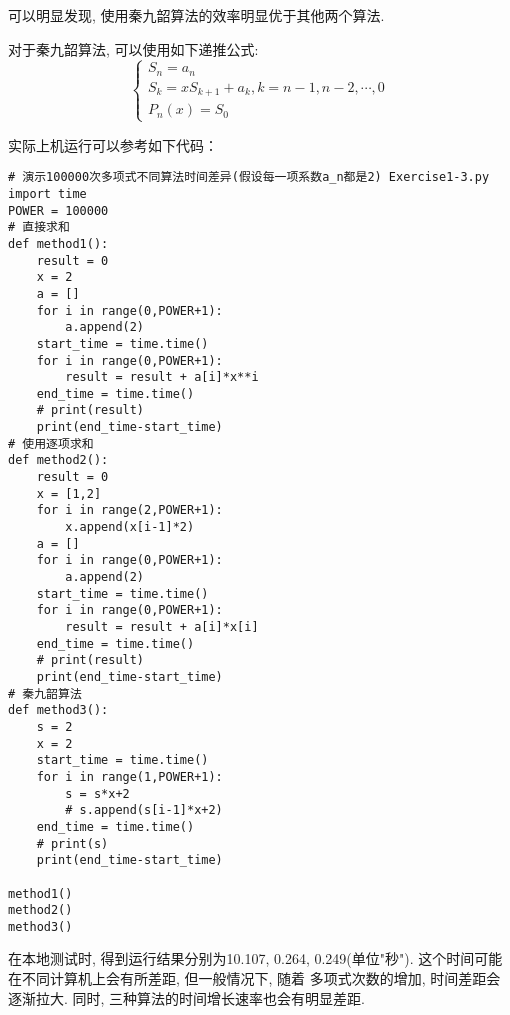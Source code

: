 可以明显发现, 使用秦九韶算法的效率明显优于其他两个算法.

对于秦九韶算法, 可以使用如下递推公式:
\begin{equation*}
    \begin{cases}
        S_n = a_n\\
        S_k = xS_{k+1}+a_k, k=n-1,n-2,\cdots,0\\
        P_n(x) = S_0
    \end{cases}
\end{equation*}

实际上机运行可以参考如下代码：
\begin{lstlisting}
# 演示100000次多项式不同算法时间差异(假设每一项系数a_n都是2) Exercise1-3.py
import time
POWER = 100000
# 直接求和
def method1():
    result = 0
    x = 2
    a = []
    for i in range(0,POWER+1):
        a.append(2)
    start_time = time.time()
    for i in range(0,POWER+1):
        result = result + a[i]*x**i
    end_time = time.time()
    # print(result)
    print(end_time-start_time)
# 使用逐项求和
def method2():
    result = 0
    x = [1,2]
    for i in range(2,POWER+1):
        x.append(x[i-1]*2)
    a = []
    for i in range(0,POWER+1):
        a.append(2)
    start_time = time.time()
    for i in range(0,POWER+1):
        result = result + a[i]*x[i]
    end_time = time.time()
    # print(result)
    print(end_time-start_time)
# 秦九韶算法
def method3():
    s = 2
    x = 2
    start_time = time.time()
    for i in range(1,POWER+1):
        s = s*x+2
        # s.append(s[i-1]*x+2)
    end_time = time.time()
    # print(s)
    print(end_time-start_time)

method1()
method2()
method3()
\end{lstlisting}

\begin{notice}
    在本地测试时, 得到运行结果分别为10.107, 0.264, 0.249(单位"秒"). 这个时间可能在不同计算机上会有所差距, 但一般情况下, 随着
    多项式次数的增加, 时间差距会逐渐拉大. 同时, 三种算法的时间增长速率也会有明显差距.
\end{notice}